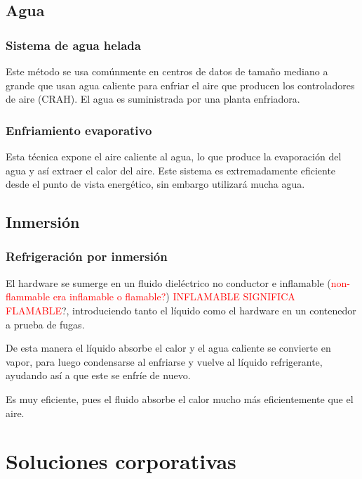 \subsection*{Agua}

\subsubsection*{Sistema de agua helada}

Este método se usa comúnmente en centros de datos de tamaño mediano a grande que usan agua caliente para enfriar el aire que producen los controladores de aire (CRAH). El agua es suministrada por una planta enfriadora.

\subsubsection*{Enfriamiento evaporativo}

Esta técnica expone el aire caliente al agua, lo que produce la evaporación del agua y así extraer el calor del aire. Este sistema es extremadamente eficiente desde el punto de vista energético, sin embargo utilizará mucha agua.

\subsection*{Inmersión}

\subsubsection*{Refrigeración por inmersión}

El hardware se sumerge en un fluido dieléctrico no conductor e inflamable (\textcolor{red}{non-flammable era inflamable o flamable?}) \textcolor{red}{INFLAMABLE SIGNIFICA FLAMABLE}?, introduciendo tanto el líquido como el hardware en un contenedor a prueba de fugas.

De esta manera el líquido absorbe el calor y el agua caliente se convierte en vapor, para luego condensarse al enfriarse y vuelve al líquido refrigerante, ayudando así a que este se enfríe de nuevo.

Es muy eficiente, pues el fluido absorbe el calor mucho más eficientemente que el aire.

\section*{Soluciones corporativas}

